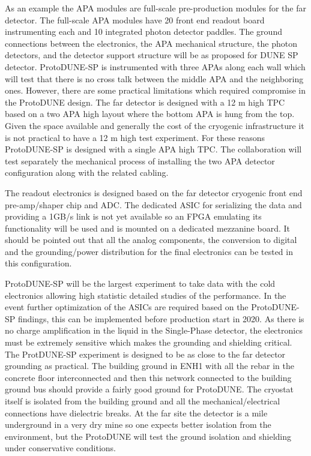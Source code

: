 As an example the APA modules are full-scale pre-production modules for the far detector. The full-scale APA modules have 20 front end readout board instrumenting each and 10 integrated photon detector paddles. The ground connections between the electronics, the APA mechanical structure, the photon detectors, and the detector support structure will be as proposed for DUNE SP detector. ProtoDUNE-SP is instrumented with three APAs along each wall which will test that there is no cross talk between the middle APA and the neighboring ones. However, there are some practical limitations which required compromise in the ProtoDUNE design. The far detector is designed with a 12 m high TPC based on a two APA high layout where the bottom APA is hung from the top. Given the space available and generally the cost of the cryogenic infrastructure it is not practical to have a 12 m high test experiment. For these reasons ProtoDUNE-SP is designed with a single APA high TPC. The collaboration will test separately the mechanical process of installing the two APA detector configuration along with the related cabling.

The readout electronics is designed based on the far detector cryogenic front end pre-amp/shaper chip and ADC.  The dedicated ASIC for serializing the data and providing a 1GB/s link is not yet available so an FPGA emulating its functionality will be used and is mounted on a dedicated mezzanine board. It should be pointed out that all the analog components, the conversion to digital and the grounding/power distribution for the final electronics can be tested in this configuration. 

ProtoDUNE-SP will be the largest experiment to take data with the cold electronics allowing high statistic detailed studies of the performance. In the event further optimization of the ASICs are required based on the ProtoDUNE-SP findings, this can be implemented before production start in 2020. As there is no charge amplification in the liquid in the Single-Phase detector, the electronics must be extremely sensitive which makes the grounding and shielding critical. The ProtDUNE-SP experiment is designed to be as close to the far detector grounding as practical. The building ground in ENH1 with all the rebar in the concrete floor interconnected and then this network connected to the building ground bus should provide a fairly good ground for ProtoDUNE. The cryostat itself is isolated from the building ground and all the mechanical/electrical connections have dielectric breaks. At the far site the detector is a mile underground in a very dry mine so one expects better isolation from the environment, but the ProtoDUNE will test the ground isolation and shielding under conservative conditions.

